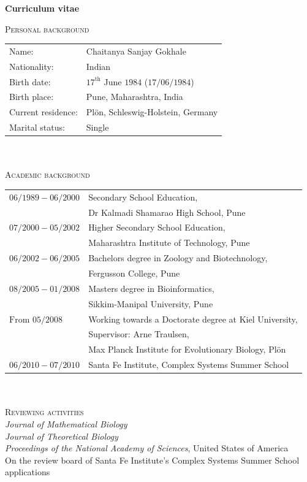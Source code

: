 \documentclass[oneside,11pt,a4paper]{book}
\begin{document}
\newpage
\normalsize
\thispagestyle{plain}
\renewcommand{\thepage}{\roman{page}}
\begin{center}
\Large{\textbf{Curriculum vitae}}
\end{center}
\small
\noindent
\textsc{Personal background}\\
\noindent
\begin{tabular}{ll}
Name:&Chaitanya Sanjay Gokhale\\
Nationality:&Indian\\
Birth date:&$17^{\text{th}}$ June $1984$ ($17/06/1984$)\\
Birth place:&Pune, Maharashtra, India\\
Current residence:&Pl\"{o}n, Schleswig-Holstein, Germany\\
Marital status:&Single
\end{tabular}
\\

\ \\
\noindent
\textsc{Academic background}\\
\noindent
\begin{tabular}{ll}
$06/1989-06/2000$&Secondary School Education,\\
&Dr Kalmadi Shamarao High School, Pune\\
$07/2000-05/2002$&Higher Secondary School Education,\\
&Maharashtra Institute of Technology, Pune\\
$06/2002-06/2005$&Bachelors degree in Zoology and Biotechnology,\\
&Fergusson College, Pune\\
$08/2005-01/2008$&Masters degree in Bioinformatics,\\
&Sikkim-Manipal University, Pune\\
$\text{From\ } 05/2008$&Working towards a Doctorate degree at Kiel University,\\
&Supervisor: Arne Traulsen, \\
&Max Planck Institute for Evolutionary Biology, Pl\"{o}n\\
$06/2010-07/2010$&Santa Fe Institute, Complex Systems Summer School
\end{tabular}
\\

\ \\
\noindent
\textsc{Reviewing activities}\\
\noindent
\textit{Journal of Mathematical Biology}\\
\textit{Journal of Theoretical Biology}\\
\textit{Proceedings of the National Academy of Sciences}, United States of America\\
On the review board of Santa Fe Institute's Complex Systems Summer School applications
\footnotesize
\printindex
\end{document}
